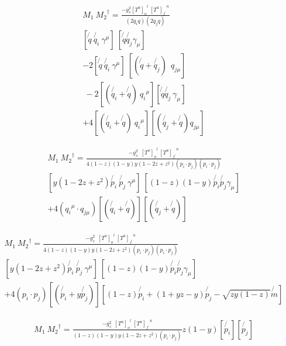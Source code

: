 \begin{equation}
\begin{split}
M_1\: {M_2}^{\dagger} = \frac{-g_s^2 {[T^a]_o}^l \:{[T^a]_{f^{\prime}}}^n }{(2q_i q)(2q_j q)} \\
[\not{q}\:\not{q_i}\: \gamma^{\mu}] \:[\not{q} \not{q_j} \gamma_{\mu}] \\
-2[\not{q}\:\not{q_i}\: \gamma^{\mu}]\:[(\not{q}+\not{q_j}) \: \: {q_{j{\mu}}}]\\
\:-2[(\not{q_i} + \not{q})\:{q_{i}}^{\mu}][\not{q} \not{q_j} \:\gamma_{\mu}]\\
+4[(\not{q_i} + \not{q})\:{q_{i}}^{\mu}][(\not{q_j} + \not{q}) {q_{j{\mu}}}]
\end{split}
\end{equation}

\begin{equation}
\begin{split}
M_1\: {M_2}^{\dagger} = \frac{-g_s^2 \:\:{[T^a]_o}^l \:{[T^a]_{f^{\prime}}}^n }{4(1-z)(1-y)y(1-2z+z^2)(p_i \cdot p_j)(p_i \cdot p_j)} \\
[y(1-2z+z^2)\not{p_i}\:\not{p_j}\: \gamma^{\mu}] \:[(1-z)(1-y)\not{p_i} \not{p_j} \gamma_{\mu}] \\
+4({q_{i}}^{\mu} \cdot {q_{j{\mu}}})[(\not{q_i} + \not{q})][(\not{q_j} + \not{q})]
\end{split}
\end{equation}

\begin{equation}
\begin{split}
M_1\: {M_2}^{\dagger} = \frac{-g_s^2 \:\:{[T^a]_o}^l \:{[T^a]_{f^{\prime}}}^n }{4(1-z)(1-y)y(1-2z+z^2)(p_i \cdot p_j)(p_i \cdot p_j)} \\
[y(1-2z+z^2)\not{p_i}\:\not{p_j}\: \gamma^{\mu}] \:[(1-z)(1-y)\not{p_i} \not{p_j} \gamma_{\mu}] \\
+4(p_i \cdot p_j)[(\not{p_i} + y\not{p_j})][(1-z)\not{p_i} + (1+yz-y) \not{p_j} - \sqrt{zy(1-z)}\not{m}]
\end{split}
\end{equation}

\begin{equation}
\begin{split}
M_1\: {M_2}^{\dagger} = \frac{-g_s^2 \:\:{[T^a]_o}^l \:{[T^a]_{f^{\prime}}}^n }{(1-z)(1-y)y(1-2z+z^2)(p_i \cdot p_j)} 
z(1-y)[\not{p_i}][\not{p_j}]
\end{split}
\end{equation}







